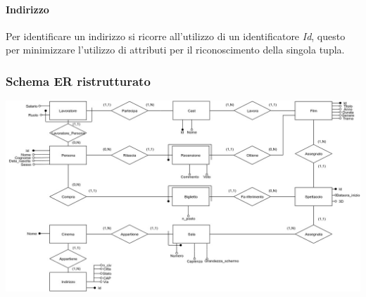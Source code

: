 \documentclass[10pt]{article}
\begin{document}
	\paragraph{Indirizzo}
	Per identificare un indirizzo si ricorre all'utilizzo di un identificatore \textit{Id}, questo per minimizzare l'utilizzo di attributi per il riconoscimento della singola tupla.
	\subsubsection{Schema ER ristrutturato}	
	\includegraphics[height=\textwidth, width=20cm, angle=90]{Schemas/SchemaER_Rev}
\end{document}
